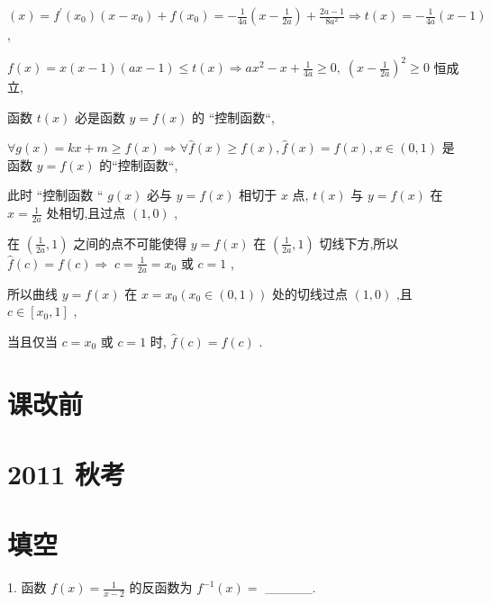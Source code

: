 \documentclass[10pt]{article}
\begin{document}
\(\left( x\right)  = {f}^{\prime }\left( {x}_{0}\right) \left( {x - {x}_{0}}\right)  + f\left( {x}_{0}\right)  =  - \frac{1}{4a}\left( {x - \frac{1}{2a}}\right)  + \frac{{2a} - 1}{8{a}^{2}} \Rightarrow  t\left( x\right)  =  - \frac{1}{4a}\left( {x - 1}\right)\) ,

\(f\left( x\right)  = x\left( {x - 1}\right) \left( {{ax} - 1}\right)  \leq  t\left( x\right)  \Rightarrow  a{x}^{2} - x + \frac{1}{4a} \geq  0,\;{\left( x - \frac{1}{2a}\right) }^{2} \geq  0\) 恒成立,

函数 \(t\left( x\right)\) 必是函数 \(y = f\left( x\right)\) 的 “控制函数“,

\(\forall g\left( x\right)  = {kx} + m \geq  f\left( x\right)  \Rightarrow  \forall \widehat{f}\left( x\right)  \geq  f\left( x\right) ,\widehat{f}\left( x\right)  = f\left( x\right) ,x \in  \left( {0,1}\right)\) 是函数 \(y = f\left( x\right)\) 的“控制函数“,

此时 “控制函数 “ \(g\left( x\right)\) 必与 \(y = f\left( x\right)\) 相切于 \(x\) 点, \(t\left( x\right)\) 与 \(y = f\left( x\right)\) 在 \(x = \frac{1}{2a}\) 处相切,且过点 \(\left( {1,0}\right)\) ,

在 \(\left( {\frac{1}{2a},1}\right)\) 之间的点不可能使得 \(y = f\left( x\right)\) 在 \(\left( {\frac{1}{2a},1}\right)\) 切线下方,所以 \(\widehat{f}\left( c\right)  = f\left( c\right)  \Rightarrow \; c = \frac{1}{2a} = {x}_{0}\) 或 \(c = 1\) ,

所以曲线 \(y = f\left( x\right)\) 在 \(x = {x}_{0}\left( {{x}_{0} \in  \left( {0,1}\right) }\right)\) 处的切线过点 \(\left( {1,0}\right)\) ,且 \(c \in  \left\lbrack  {{x}_{0},1}\right\rbrack\) ,

当且仅当 \(c = {x}_{0}\) 或 \(c = 1\) 时, \(\widehat{f}\left( c\right)  = f\left( c\right)\) .

\section*{课改前}

\section*{2011 秋考}

\section*{填空}

1. 函数 \(f\left( x\right)  = \frac{1}{x - 2}\) 的反函数为 \({f}^{-1}\left( x\right)  =\) \_\_\_\_\_.
\end{document}
